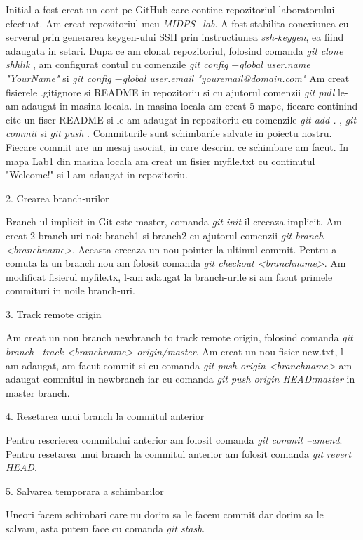  Initial a fost creat un cont pe GitHub care contine repozitoriul laboratorului efectuat. Am creat repozitoriul meu \textit {MIDPS$-$lab}. A fost stabilita conexiunea cu serverul prin generarea keygen-ului SSH prin instructiunea \textit {ssh-keygen}, ea fiind adaugata in setari.  Dupa ce am clonat repozitoriul, folosind comanda \textit {git clone shhlik} , am configurat contul cu comenzile \textit {git config $-$global user.name "YourName"} si \textit {git config $-$global user.email "youremail@domain.com"}  Am creat fisierele .gitignore si README in repozitoriu si cu ajutorul comenzii \textit {git pull} le-am adaugat in masina locala. In masina locala am creat 5 mape, fiecare continind cite un fiser README si le-am adaugat in repozitoriu cu comenzile \textit {git add .} , \textit {git commit} si \textit {git push} . Commiturile sunt schimbarile salvate in poiectu nostru. Fiecare commit are un mesaj asociat, in care descrim ce schimbare am facut. In mapa Lab1 din masina locala am creat un fisier myfile.txt cu continutul "Welcome!" si l-am adaugat in repozitoriu.

2. Crearea branch-urilor 

Branch-ul implicit in Git este master, comanda \textit {git init} il creeaza implicit. Am creat 2 branch-uri noi: branch1 si branch2 cu ajutorul comenzii \textit {git branch <branchname>}. Aceasta creeaza un nou pointer la ultimul commit. Pentru a comuta la un branch nou am folosit comanda \textit {git checkout <branchname>}. Am modificat fisierul myfile.tx, l-am adaugat la branch-urile si am facut primele commituri in noile branch-uri.

3. Track remote origin

 Am creat un nou branch newbranch  to track remote origin, folosind comanda \textit {git branch --track <branchname> origin/master}. Am creat un nou fisier new.txt, l-am adaugat, am facut commit si cu comanda \textit {git push origin <branchname>} am adaugat commitul in newbranch iar cu comanda \textit {git push origin HEAD:master} in master branch.
 
 4. Resetarea unui branch la commitul anterior
 
 Pentru rescrierea commitului anterior am folosit comanda \textit {git commit --amend}. Pentru resetarea unui branch la commitul anterior am folosit comanda \textit {git revert HEAD}.
 
 5. Salvarea temporara a schimbarilor
 
 Uneori facem schimbari care nu dorim sa le facem commit dar dorim sa le salvam, asta putem face cu comanda \textit {git stash}.
 
